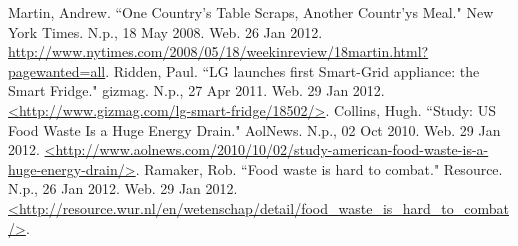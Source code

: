 \documentclass[11pt,letterpaper]{article}
\begin{document}
\pagebreak

\begin{thebibliography}{9}
Martin, Andrew. ``One Country's Table Scraps, Another Countr'ys Meal." New York Times. N.p., 18 May 2008. Web. 26 Jan 2012. 
\url{http://www.nytimes.com/2008/05/18/weekinreview/18martin.html?pagewanted=all}.
Ridden, Paul. ``LG launches first Smart-Grid appliance: the Smart Fridge." gizmag. N.p., 27 Apr 2011. Web. 29 Jan 2012. \url{<http://www.gizmag.com/lg-smart-fridge/18502/>}.
Collins, Hugh. ``Study: US Food Waste Is a Huge Energy Drain." AolNews. N.p., 02 Oct 2010. Web. 29 Jan 2012. \url{<http://www.aolnews.com/2010/10/02/study-american-food-waste-is-a-huge-energy-drain/>}.
Ramaker, Rob. ``Food waste is hard to combat." Resource. N.p., 26 Jan 2012. Web. 29 Jan 2012. \url{<http://resource.wur.nl/en/wetenschap/detail/food_waste_is_hard_to_combat/>}.
 \end{thebibliography}
\end{document}
